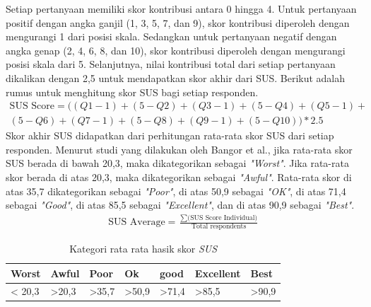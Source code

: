 Setiap pertanyaan memiliki skor kontribusi antara 0 hingga 4. 
Untuk pertanyaan positif dengan angka ganjil (1, 3, 5, 7, dan 9), skor kontribusi diperoleh dengan mengurangi 1 dari posisi skala.
Sedangkan untuk pertanyaan negatif dengan angka genap (2, 4, 6, 8, dan 10), skor kontribusi diperoleh dengan mengurangi posisi skala dari 5.
Selanjutnya, nilai kontribusi total dari setiap pertanyaan dikalikan dengan 2,5 untuk mendapatkan skor akhir dari SUS. Berikut adalah rumus untuk menghitung skor SUS bagi setiap responden.
\begin{equation}
\begin{split}
	\text{SUS Score} = ((Q1-1)+(5-Q2)+(Q3-1)+(5-Q4)+(Q5-1)+ \\ 
	(5-Q6)+(Q7-1)+(5-Q8)+(Q9-1)+(5-Q10))*2.5
\end{split}
\end{equation}
Skor akhir SUS didapatkan dari perhitungan rata-rata skor SUS dari setiap responden.
Menurut studi yang dilakukan oleh Bangor et al., 
jika rata-rata skor SUS berada di bawah 20,3, maka dikategorikan sebagai \textit{"Worst"}.
Jika rata-rata skor berada di atas 20,3, maka dikategorikan sebagai\textit{ "Awful"}. 
Rata-rata skor di atas 35,7 dikategorikan sebagai \textit{"Poor"}, di atas 50,9 sebagai \textit{"OK"}, di atas 71,4 sebagai \textit{"Good"}, di atas 85,5 sebagai \textit{"Excellent"}, dan di atas 90,9 sebagai \textit{"Best"}.
\begin{equation}
	\begin{split}
		\text{SUS Average} = \frac{\sum \text{(SUS Score Individual)}}{\text{Total respondents}} 
	\end{split}
	\label{Perhitungan rata-rata skor SUS}
\end{equation}
\begin{table}[htbp]
	\centering
	\caption{Kategori rata rata hasik skor \textit{SUS}}
	\begin{tabular}{|m{}|m{}|m{}|m{}|m{}|m{}|m{}|}
		\hline
		Worst & Awful & Poor & Ok & good & Excellent & Best \\
		\hline
		< 20,3 & >20,3 & >35,7& >50,9 & >71,4& >85,5 & >90,9 \\
		\hline
	\end{tabular}
\end{table}

